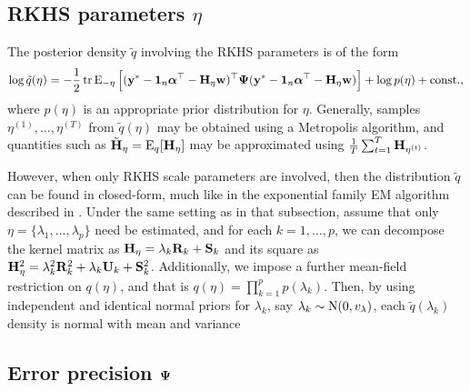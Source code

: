 \subsection[RKHS parameters eta]{RKHS parameters $\eta$}

The posterior density $\tilde q$ involving the RKHS parameters is of the form
\[
  \log\tilde q(\eta) =  -\frac{1}{2}\operatorname{tr}\operatorname{E}_{-\eta} \Big[ 
  ({\mathbf y}^* - {\mathbf 1}_n{\bm\alpha}^\top - {\mathbf H}_\eta{\mathbf w})^\top {\bm\Psi} ({\mathbf y}^* - {\mathbf 1}_n{\bm\alpha}^\top - {\mathbf H}_\eta{\mathbf w}) \Big] + \log p(\eta) + \text{const.}\hspace{0.01em},
\]
where $p(\eta)$ is an appropriate prior distribution for $\eta$.
Generally, samples $\eta^{(1)},\dots,\eta^{(T)}$ from $\tilde q(\eta)$ may be obtained using a Metropolis algorithm, and quantities such as $\tilde{{\mathbf H}}_{\eta} = \operatorname{E}_q[{\mathbf H}_{\eta}]$ may be approximated using $\frac{1}{T}\sum_{t=1}^T {\mathbf H}_{\eta^{(t)}}$.

However, when only RKHS scale parameters are involved, then the distribution $\tilde q$ can be found in closed-form, much like in the exponential family EM algorithm described in .
Under the same setting as in that subsection, assume that only $\eta = \{\lambda_1,\dots,\lambda_p\}$ need be estimated, and for each $k=1,\dots,p$, we can decompose the kernel matrix as ${\mathbf H}_\eta = \lambda_k {\mathbf R}_k + {\mathbf S}_k$ and its square as ${\mathbf H}_\eta^2 = \lambda_k^2 {\mathbf R}_k^2 + \lambda_k {\mathbf U}_k + {\mathbf S}_k^2$.
Additionally, we impose a further mean-field restriction on $q(\eta)$, and that is $q(\eta) = \prod_{k=1}^p p(\lambda_k)$.
Then, by using independent and identical normal priors for $\lambda_k$, say $\lambda_k \sim \operatorname{N}(0,v_\lambda)$, each $\tilde q(\lambda_k)$ density is normal with mean and variance


\subsection[Error precision Psi]{Error precision ${\bm\Psi}$}


